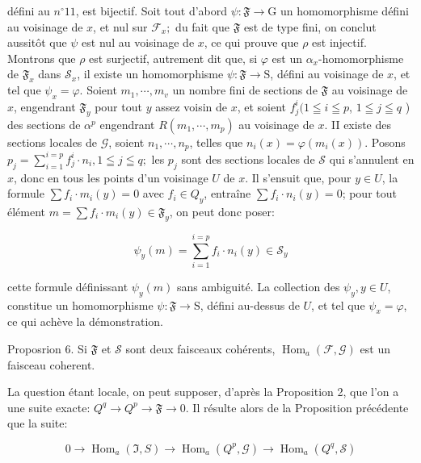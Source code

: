 défini au $n^{\circ} 11$, est bijectif. Soit tout d'abord $\psi: \mathfrak{F} \rightarrow \mathrm{G}$ un homomorphisme défini au voisinage de $x$, et nul sur $\mathcal{F}_{x} ;$ du fait que $\mathfrak{F}$ est de type fini, on conclut aussitôt que $\psi$ est nul au voisinage de $x$, ce qui prouve que $\rho$ est injectif. Montrons que $\rho$ est surjectif, autrement dit que, si $\varphi$ est un $\alpha_{x}$-homomorphisme de $\mathfrak{F}_{x}$ dans $\mathcal{S}_{x}$, il existe un homomorphisme $\psi: \mathfrak{F} \rightarrow \mathrm{S}$, défini au voisinage de $x$, et tel que $\psi_{x}=\varphi$. Soient $m_{1}, \cdots, m_{v}$ un nombre fini de sections de $\mathfrak{F}$ au voisinage de $x$, engendrant $\mathfrak{F}_{y}$ pour tout $y$ assez voisin de $x$, et soient $f_{j}^{i}(1 \leqq i \leqq p$, $1 \leqq j \leqq q$ ) des sections de $\alpha^{p}$ engendrant $R\left(m_{1}, \cdots, m_{p}\right)$ au voisinage de $x$. II existe des sections locales de $\mathcal{G}$, soient $n_{1}, \cdots, n_{p}$, telles que $n_{i}(x)=\varphi\left(m_{i}(x)\right)$. Posons $p_{j}=\sum_{i=1}^{i=p} f_{j}^{i} \cdot n_{i}, 1 \leqq j \leqq q ;$ les $p_{j}$ sont des sections locales de $\mathcal{S}$ qui s'annulent en $x$, donc en tous les points d'un voisinage $U$ de $x$. Il s'ensuit que, pour $y \in U$, la formule $\sum f_{i} \cdot m_{i}(y)=0$ avec $f_{i} \in Q_{y}$, entraîne $\sum f_{i} \cdot n_{i}(y)=0$; pour tout élément $m=\sum f_{i} \cdot m_{i}(y) \in \mathfrak{F}_{y}$, on peut donc poser:

$$
\psi_{y}(m)=\sum_{i=1}^{i=p} f_{i} \cdot n_{i}(y) \in \mathcal{S}_{y}
$$

cette formule définissant $\psi_{y}(m)$ sans ambiguité. La collection des $\psi_{y}, y \in U$, constitue un homomorphisme $\psi: \mathfrak{F} \rightarrow \mathrm{S}$, défini au-dessus de $U$, et tel que $\psi_{x}=\varphi$, ce qui achève la démonstration.

Proposrion 6. Si $\mathfrak{F}$ et $\mathcal{S}$ sont deux faisceaux cohérents, $\operatorname{Hom}_{a}(\mathcal{F}, \mathcal{G})$ est un faisceau coherent.

La question étant locale, on peut supposer, d'après la Proposition 2, que l'on a une suite exacte: $Q^{q} \rightarrow Q^{p} \rightarrow \mathfrak{F} \rightarrow 0$. Il résulte alors de la Proposition précédente que la suite:

$$
0 \rightarrow \operatorname{Hom}_{a}(\Im, S) \rightarrow \operatorname{Hom}_{a}\left(Q^{p}, \mathcal{G}\right) \rightarrow \operatorname{Hom}_{a}\left(Q^{q}, \mathcal{S}\right)
$$


